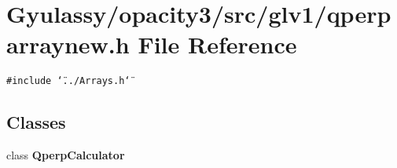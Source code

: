 \section{Gyulassy/opacity3/src/glv1/qperparraynew.h File Reference}
\label{qperparraynew_8h}
{\tt \#include \char`\"{}../Arrays.h\char`\"{}}\par
\subsection*{Classes}
\begin{CompactItemize}
\item 
class {\bf QperpCalculator}
\end{CompactItemize}
